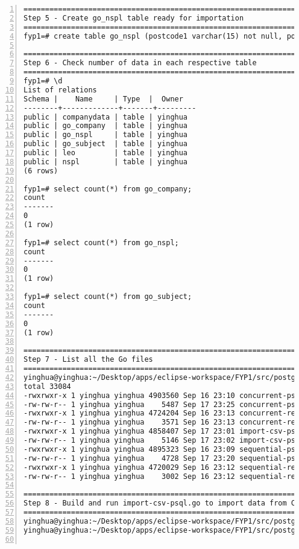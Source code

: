 \begin{lstlisting}[breaklines, frame=single, numbers=left, caption={Linux command for import data}, label=commandline-02]
==================================================================
Step 5 - Create go_nspl table ready for importation 
==================================================================
fyp1=# create table go_nspl (postcode1 varchar(15) not null, postcode2 varchar(15) not null primary key, date_introduce varchar(10) not null,usertype int not null, position_quality int not null);

==================================================================
Step 6 - Check number of data in each respective table
==================================================================
fyp1=# \d
List of relations
Schema |    Name     | Type  |  Owner  
--------+-------------+-------+---------
public | companydata | table | yinghua
public | go_company  | table | yinghua
public | go_nspl     | table | yinghua
public | go_subject  | table | yinghua
public | leo         | table | yinghua
public | nspl        | table | yinghua
(6 rows)

fyp1=# select count(*) from go_company;
count 
-------
0
(1 row)

fyp1=# select count(*) from go_nspl;
count 
-------
0
(1 row)

fyp1=# select count(*) from go_subject;
count 
-------
0
(1 row)

==================================================================
Step 7 - List all the Go files 
==================================================================
yinghua@yinghua:~/Desktop/apps/eclipse-workspace/FYP1/src/postgres-process$ ls -l
total 33084
-rwxrwxr-x 1 yinghua yinghua 4903560 Sep 16 23:10 concurrent-psql
-rw-rw-r-- 1 yinghua yinghua    5487 Sep 17 23:25 concurrent-psql.go
-rwxrwxr-x 1 yinghua yinghua 4724204 Sep 16 23:13 concurrent-read-csv
-rw-rw-r-- 1 yinghua yinghua    3571 Sep 16 23:13 concurrent-read-csv.go
-rwxrwxr-x 1 yinghua yinghua 4858407 Sep 17 23:01 import-csv-psql
-rw-rw-r-- 1 yinghua yinghua    5146 Sep 17 23:02 import-csv-psql.go
-rwxrwxr-x 1 yinghua yinghua 4895323 Sep 16 23:09 sequential-psql
-rw-rw-r-- 1 yinghua yinghua    4728 Sep 17 23:20 sequential-psql.go
-rwxrwxr-x 1 yinghua yinghua 4720029 Sep 16 23:12 sequential-read-csv
-rw-rw-r-- 1 yinghua yinghua    3002 Sep 16 23:12 sequential-read-csv.go

===============================================================================
Step 8 - Build and run import-csv-psql.go to import data from CSV to PostgreSQL
===============================================================================
yinghua@yinghua:~/Desktop/apps/eclipse-workspace/FYP1/src/postgres-process$ go build import-csv-psql.go
yinghua@yinghua:~/Desktop/apps/eclipse-workspace/FYP1/src/postgres-process$ time go run import-csv-psql.go


\end{lstlisting}

